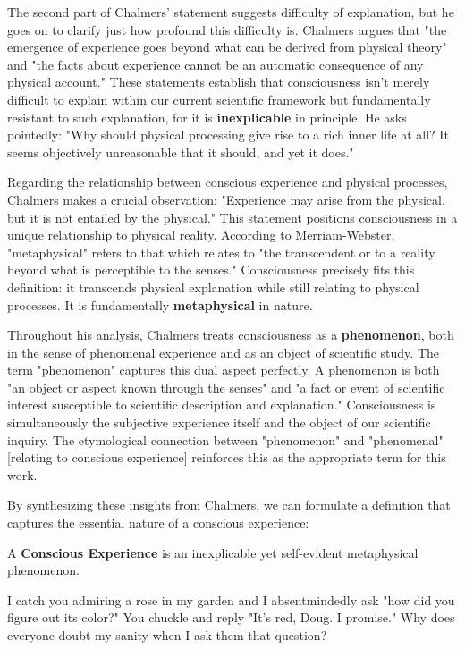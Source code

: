 \documentclass[runningheads]{llncs}
\begin{document}
The second part of Chalmers' statement suggests difficulty of explanation, but he goes on to clarify just how profound this difficulty is. Chalmers argues that "the emergence of experience goes beyond what can be derived from physical theory" and "the facts about experience cannot be an automatic consequence of any physical account." These statements establish that consciousness isn't merely difficult to explain within our current scientific framework but fundamentally resistant to such explanation, for it is \textbf{inexplicable} in principle. He asks pointedly: "Why should physical processing give rise to a rich inner life at all? It seems objectively unreasonable that it should, and yet it does."

Regarding the relationship between conscious experience and physical processes, Chalmers makes a crucial observation: "Experience may arise from the physical, but it is not entailed by the physical." This statement positions consciousness in a unique relationship to physical reality. According to Merriam-Webster, "metaphysical" refers to that which relates to "the transcendent or to a reality beyond what is perceptible to the senses." Consciousness precisely fits this definition: it transcends physical explanation while still relating to physical processes. It is fundamentally \textbf{metaphysical} in nature.

Throughout his analysis, Chalmers treats consciousness as a \textbf{phenomenon}, both in the sense of phenomenal experience and as an object of scientific study. The term "phenomenon" captures this dual aspect perfectly. A phenomenon is both "an object or aspect known through the senses" and "a fact or event of scientific interest susceptible to scientific description and explanation." Consciousness is simultaneously the subjective experience itself and the object of our scientific inquiry. The etymological connection between "phenomenon" and "phenomenal" [relating to conscious experience] reinforces this as the appropriate term for this work.

By synthesizing these insights from Chalmers, we can formulate a definition that captures the essential nature of a conscious experience:

\setcounter{definition}{0}
\begin{cdefinition}
	A \textbf{Conscious Experience} is an inexplicable yet self-evident metaphysical phenomenon.
\end{cdefinition}

\setcounter{definition}{0}
\begin{cexample}
I catch you admiring a rose in my garden and I absentmindedly ask "how did you figure out its color?" You chuckle and reply "It's red, Doug. I promise." Why does everyone doubt my sanity when I ask them that question?
\end{cexample}
\end{document}
